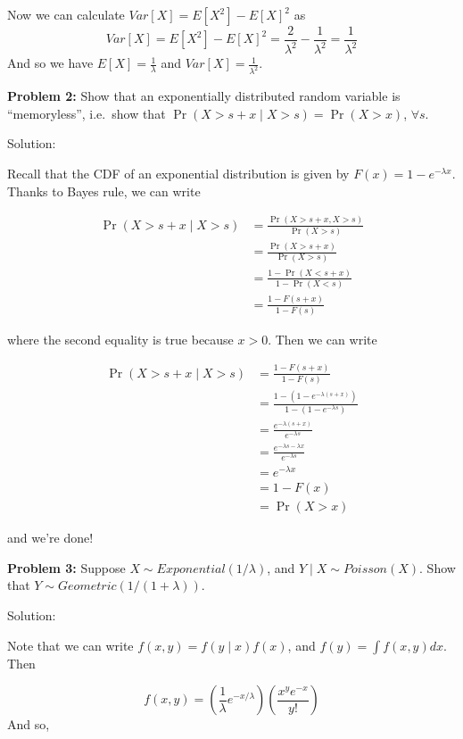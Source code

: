 \documentclass[
  letterpaper,
  DIV=11,
  numbers=noendperiod]{scrreprt}
\begin{document}
Now we can calculate \(Var[X] = E[X^2] - E[X]^2\) as \[
Var[X] = E[X^2] - E[X]^2 = \frac{2}{\lambda^2} - \frac{1}{\lambda^2} = \frac{1}{\lambda^2}
\] And so we have \(E[X] = \frac{1}{\lambda}\) and
\(Var[X] = \frac{1}{\lambda^2}\).

\textbf{Problem 2:} Show that an exponentially distributed random
variable is ``memoryless'', i.e.~show that
\(\Pr(X > s + x \mid X > s) = \Pr(X > x)\), \(\forall s\).

Solution:

Recall that the CDF of an exponential distribution is given by
\(F(x) = 1-e^{-\lambda x}\). Thanks to Bayes rule, we can write

\begin{align*}
    \Pr(X > s + x \mid X > s) & = \frac{\Pr(X > s + x , X > s)}{\Pr(X > s)} \\
    & = \frac{\Pr(X > s + x)}{\Pr(X > s)} \\
    & = \frac{1 - \Pr(X < s + x)}{1 - \Pr(X < s)} \\
    & = \frac{1 - F(s + x)}{1 - F(s)}
\end{align*}

where the second equality is true because \(x > 0\). Then we can write

\begin{align*}
    \Pr(X > s + x \mid X > s) & = \frac{1 - F(s + x)}{1 - F(s)} \\
    & = \frac{1 - \left(1 - e^{-\lambda(s + x)}\right)}{1 - \left(1 - e^{-\lambda s}\right)} \\
    & = \frac{e^{-\lambda(s + x)}}{e^{-\lambda s}} \\
    & = \frac{e^{-\lambda s - \lambda x}}{e^{-\lambda s}} \\
    & = e^{-\lambda x} \\
    & = 1 - F(x) \\
    & = \Pr(X > x)
\end{align*}

and we're done!

\textbf{Problem 3:} Suppose \(X \sim Exponential(1/\lambda)\), and
\(Y \mid X \sim Poisson(X)\). Show that
\(Y \sim Geometric(1/(1 + \lambda))\).

Solution:

Note that we can write \(f(x, y) = f(y \mid x) f(x)\), and
\(f(y) = \int f(x, y) dx\). Then

\[
f(x, y) = \left( \frac{1}{\lambda} e^{-x/\lambda} \right) \left( \frac{x^y e^{-x}}{y!} \right)
\] And so,
\end{document}
